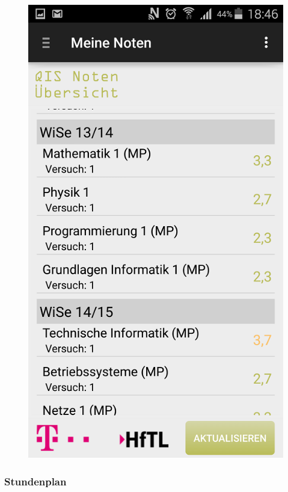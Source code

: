\begin{figure}[h]
	\centering
	\includegraphics[scale=0.6]{03_Bedienungsanleitung/img/noten.png}
	\label{img:grafik-dummy}
\end{figure}

\newpage

\subsubsection{Stundenplan}

